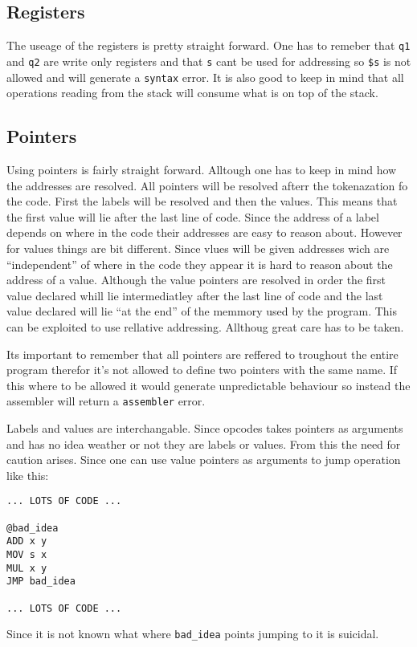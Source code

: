 \documentclass{article}
\newcommand{\V}{\verb}
\begin{document}
\subsection{Registers}
The useage of the registers is pretty straight forward. One has to remeber that
\V+q1+ and \V+q2+ are write only registers and that \V+s+ cant be used for
addressing so \verb+$s+ is not allowed and will generate a \verb+syntax+ error.
It is also good to keep in mind that all operations reading from the stack will
consume what is on top of the stack.

\subsection{Pointers}
Using pointers is fairly straight forward. Alltough one has to keep in mind how
the addresses are resolved. All pointers will be resolved afterr the
tokenazation fo the code. First the labels will be resolved and then the values.
This means that the first value will lie after the last line of code. Since the
address of a label depends on where in the code their addresses are easy to
reason about. However for values things are bit different. Since vlues will be
given addresses wich are ``independent'' of where in the code they appear it is
hard to reason about the address of a value. Although the value pointers are
resolved in order the first value declared whill lie intermediatley after the
last line of code and the last value declared will lie ``at the end'' of the
memmory used by the program. This can be exploited to use rellative addressing.
Allthoug great care has to be taken.

Its important to remember that all pointers are reffered to troughout the entire
program therefor it's not allowed to define two pointers with the same name. If
this where to be allowed it would generate unpredictable behaviour so instead
the assembler will return a \V+assembler+ error.

Labels and values are interchangable. Since opcodes takes pointers as arguments
and has no idea weather or not they are labels or values. From this the need for
caution arises. Since one can use value pointers as arguments to jump operation
like this:
\begin{verbatim}
... LOTS OF CODE ...

@bad_idea
ADD x y
MOV s x
MUL x y
JMP bad_idea

... LOTS OF CODE ...
\end{verbatim}
Since it is not known what where \V+bad_idea+ points jumping to it is suicidal.
\end{document}
